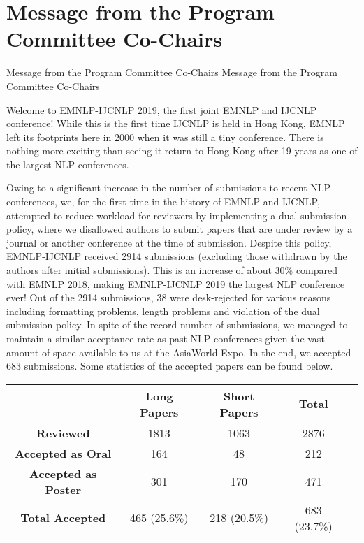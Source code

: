 \section{Message from the Program Committee Co-Chairs}
\setheaders%
    {Message from the Program Committee Co-Chairs}%
    {Message from the Program Committee Co-Chairs}
\thispagestyle{emptyheader}


\setlength{\parskip}{.7ex}

Welcome to EMNLP-IJCNLP 2019, the first joint EMNLP and IJCNLP conference! While this is the first time IJCNLP is held in Hong Kong, EMNLP left its footprints here in 2000 when it was still a tiny conference. There is nothing more exciting than seeing it return to Hong Kong after 19 years as one of the largest NLP conferences.

Owing to a significant increase in the number of submissions to recent NLP conferences, we, for the first time in the history of EMNLP and IJCNLP, attempted to reduce workload for reviewers by implementing a dual submission policy, where we disallowed authors to submit papers that are under review by a journal or another conference at the time of submission. Despite this policy, EMNLP-IJCNLP received 2914 submissions (excluding those withdrawn by the authors after initial submissions). This is an increase of about 30\% compared with EMNLP 2018, making EMNLP-IJCNLP 2019 the largest NLP conference ever! Out of the 2914 submissions, 38 were desk-rejected for various reasons including formatting problems, length problems and violation of the dual submission policy. In spite of the record number of submissions, we managed to maintain a similar acceptance rate as past NLP conferences given the vast amount of space available to us at the AsiaWorld-Expo. In the end, we accepted 683 submissions. Some statistics of the accepted papers can be found below.



\begin{table}[h]
    \begin{center}
\begin{tabular}[h]{|c|c|c|c|c|}
\hline
    & \textbf{Long Papers} & \textbf{Short Papers} & \textbf{Total} \\
\hline
    \textbf{Reviewed} & 1813 & 1063 & 2876 \\
\hline
    \textbf{Accepted as Oral} & 164 &  48 & 212 \\
\hline
    \textbf{Accepted as Poster} & 301 & 170 & 471 \\
\hline
    \textbf{Total Accepted} & 465 (25.6\%) &  218 (20.5\%) & 683 (23.7\%) \\
\hline
\end{tabular}
    \end{center}
\end{table}

